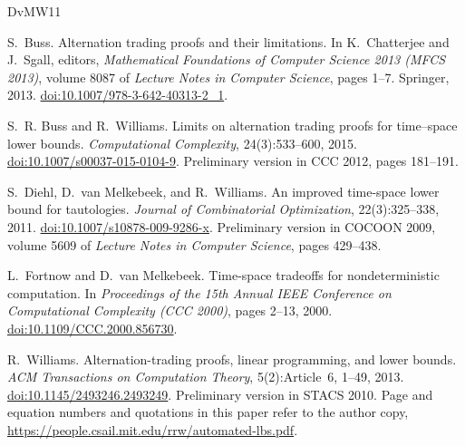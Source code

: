 \documentclass[11pt]{article}
\theoremstyle{definition}
\begin{document}
\begin{thebibliography}{DvMW11}

S.~Buss.
\newblock Alternation trading proofs and their limitations.
\newblock In K.~Chatterjee and J.~Sgall, editors, \emph{Mathematical Foundations of Computer Science 2013 (MFCS 2013)}, volume 8087 of \emph{Lecture Notes in Computer Science}, pages 1--7. Springer, 2013.
\newblock \href{https://doi.org/10.1007/978-3-642-40313-2_1}{doi:10.1007/978-3-642-40313-2\_1}.

S.~R. Buss and R.~Williams.
\newblock Limits on alternation trading proofs for time--space lower bounds.
\newblock \emph{Computational Complexity}, 24(3):533--600, 2015.
\newblock \href{https://doi.org/10.1007/s00037-015-0104-9}{doi:10.1007/s00037-015-0104-9}.
\newblock Preliminary version in CCC 2012, pages 181--191.

S.~Diehl, D.~van Melkebeek, and R.~Williams.
\newblock An improved time-space lower bound for tautologies.
\newblock \emph{Journal of Combinatorial Optimization}, 22(3):325--338, 2011.
\newblock \href{https://doi.org/10.1007/s10878-009-9286-x}{doi:10.1007/s10878-009-9286-x}.
\newblock Preliminary version in COCOON 2009, volume 5609 of \emph{Lecture Notes in Computer Science}, pages 429--438.

L.~Fortnow and D.~van Melkebeek.
\newblock Time-space tradeoffs for nondeterministic computation.
\newblock In \emph{Proceedings of the 15th Annual IEEE Conference on Computational Complexity (CCC 2000)}, pages 2--13, 2000.
\newblock \href{https://doi.org/10.1109/CCC.2000.856730}{doi:10.1109/CCC.2000.856730}.

R.~Williams.
\newblock Alternation-trading proofs, linear programming, and lower bounds.
\newblock \emph{ACM Transactions on Computation Theory}, 5(2):Article~6, 1--49, 2013.
\newblock \href{https://doi.org/10.1145/2493246.2493249}{doi:10.1145/2493246.2493249}.
\newblock Preliminary version in STACS 2010.
\newblock Page and equation numbers and quotations in this paper refer to the author copy, \url{https://people.csail.mit.edu/rrw/automated-lbs.pdf}.

\end{thebibliography}
\end{document}
